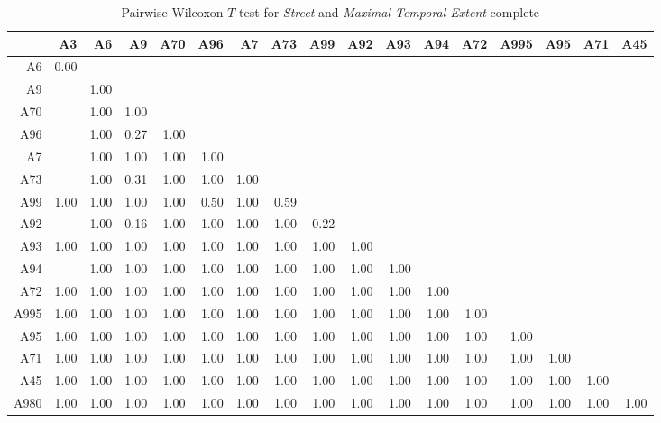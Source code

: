     \begin{table}[ht!]
        \tiny
        \setlength{\tabcolsep}{4pt}
        \centering
        \begin{tabular}{rrrrrrrrrrrrrrrrr}
            \toprule
                    & A3 & A6 & A9 & A70 & A96 & A7 & A73 & A99 & A92 & A93 & A94 & A72 & A995 & A95 & A71 & A45 \\ 
            \midrule
            A6 		& 0.00 &  &  &  &  &  &  &  &  &  &  &  &  &  &  &  \\ 
            A9 		& \red{0.01} & 1.00 &  &  &  &  &  &  &  &  &  &  &  &  &  &  \\ 
            A70 	& \red{0.03} & 1.00 & 1.00 &  &  &  &  &  &  &  &  &  &  &  &  &  \\ 
            A96 	& \red{0.00} & 1.00 & 0.27 & 1.00 &  &  &  &  &  &  &  &  &  &  &  &  \\ 
            A7 		& \red{0.00} & 1.00 & 1.00 & 1.00 & 1.00 &  &  &  &  &  &  &  &  &  &  &  \\ 
            A73 	& \red{0.00} & 1.00 & 0.31 & 1.00 & 1.00 & 1.00 &  &  &  &  &  &  &  &  &  &  \\ 
            A99 	& 1.00 & 1.00 & 1.00 & 1.00 & 0.50 & 1.00 & 0.59 &  &  &  &  &  &  &  &  &  \\ 
            A92 	& \red{0.00} & 1.00 & 0.16 & 1.00 & 1.00 & 1.00 & 1.00 & 0.22 &  &  &  &  &  &  &  &  \\ 
            A93 	& 1.00 & 1.00 & 1.00 & 1.00 & 1.00 & 1.00 & 1.00 & 1.00 & 1.00 &  &  &  &  &  &  &  \\ 
            A94 	& \red{0.01} & 1.00 & 1.00 & 1.00 & 1.00 & 1.00 & 1.00 & 1.00 & 1.00 & 1.00 &  &  &  &  &  &  \\ 
            A72 	& 1.00 & 1.00 & 1.00 & 1.00 & 1.00 & 1.00 & 1.00 & 1.00 & 1.00 & 1.00 & 1.00 &  &  &  &  &  \\ 
            A995 	& 1.00 & 1.00 & 1.00 & 1.00 & 1.00 & 1.00 & 1.00 & 1.00 & 1.00 & 1.00 & 1.00 & 1.00 &  &  &  &  \\ 
            A95 	& 1.00 & 1.00 & 1.00 & 1.00 & 1.00 & 1.00 & 1.00 & 1.00 & 1.00 & 1.00 & 1.00 & 1.00 & 1.00 &  &  &  \\ 
            A71 	& 1.00 & 1.00 & 1.00 & 1.00 & 1.00 & 1.00 & 1.00 & 1.00 & 1.00 & 1.00 & 1.00 & 1.00 & 1.00 & 1.00 &  &  \\ 
            A45 	& 1.00 & 1.00 & 1.00 & 1.00 & 1.00 & 1.00 & 1.00 & 1.00 & 1.00 & 1.00 & 1.00 & 1.00 & 1.00 & 1.00 & 1.00 &  \\ 
            A980 	& 1.00 & 1.00 & 1.00 & 1.00 & 1.00 & 1.00 & 1.00 & 1.00 & 1.00 & 1.00 & 1.00 & 1.00 & 1.00 & 1.00 & 1.00 & 1.00 \\ 
            \bottomrule
        \end{tabular}
        \caption{Pairwise Wilcoxon $T$-test for \textit{Street} and \textit{Maximal Temporal Extent} complete}
        \label{tbl:wilcoxon_baysis_matched_Str_TMax_complete}
    \end{table}

